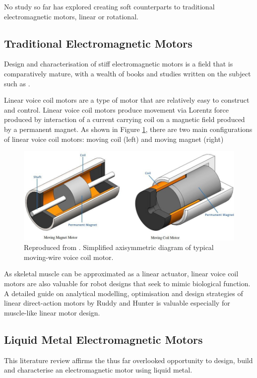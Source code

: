 \documentclass[a4paper,12pt]{article}
\begin{document}
No study so far has explored creating soft counterparts to traditional electromagnetic motors, linear or rotational.

\subsection{Traditional Electromagnetic Motors}
Design and characterisation of stiff electromagnetic motors is a field that is comparatively mature, with a wealth of books and studies written on the subject such as \cite{moritzElectromechanicalMotionSystems2013}.

Linear voice coil motors are a type of motor that are relatively easy to construct and control. Linear voice coil motors produce movement via Lorentz force produced by interaction of a current carrying coil on a magnetic field produced by a permanent magnet. As shown in Figure \ref{fg:coilmotor}, there are two main configurations of linear voice coil motors: moving coil (left) and moving magnet (right)

\begin{figure}[h!]
    \centering
    \includegraphics[width=\textwidth]{motorDiagram.jpg}
    \caption{Reproduced from \cite{h2wtechnologiesWhatVoiceCoil2018}. Simplified axisymmetric diagram of typical moving-wire voice coil motor.}
    \label{fg:coilmotor}
\end{figure}

As skeletal muscle can be approximated as a linear actuator, linear voice coil motors are also valuable for robot designs that seek to mimic biological function. A detailed guide on analytical modelling, optimisation and design strategies of linear direct-action motors by Ruddy and Hunter \cite{ruddyDesignOptimizationStrategies2011} is valuable especially for muscle-like linear motor design.

\subsection{Liquid Metal Electromagnetic Motors}
This literature review affirms the thus far overlooked opportunity to design, build and characterise an electromagnetic motor using liquid metal.
\end{document}
